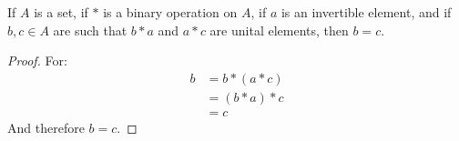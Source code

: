     \begin{theorem}
        \label{thm:Assoc_Op_Inverses_are_Unique}%
        If $A$ is a set, if $*$ is a binary operation on $A$, if $a$ is an
        invertible element, and if $b,c\in{A}$ are such that $b*a$ and $a*c$
        are unital elements, then $b=c$.
    \end{theorem}
    \begin{proof}
        For:
        \begin{align}
            b&=b*(a*c)
            \tag{$a*b$ is a unital element}\\
            &=(b*a)*c
            \tag{Associativity}\\
            &=c
            \tag{$b*a$ is a unital element}
        \end{align}
        And therefore $b=c$.
    \end{proof}

